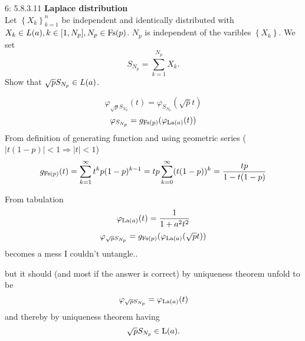 \documentclass[a4paper,twoside=false,abstract=false,numbers=noenddot,
titlepage=false,headings=small,parskip=half,version=last]{scrartcl}
\begin{document}

\begin{exercise}{6: 5.8.3.11} \textbf{Laplace distribution} \\
    Let $\left\{{X_k}\right\}_{k=1}^n$ be independent and identically
    distributed with
    ${X_k \in\text{$L$}(a),}\, {k\in[1,N_p],}\, {N_p\in \text{Fs}(p)}$.
    $N_p$ is independent of the varibles $\left\{X_k\right\}$. We set
    \begin{equation}
        S_{N_p} = \sum\limits_{k=1}^{N_p}X_k.
    \end{equation}
    Show that $\sqrt{p}S_{N_p}\in\text{$L$}(a)$.
\end{exercise}
\begin{solution}
    \begin{equation}
        \varphi_{\sqrt{p}S_{N_p}}(t) = \varphi_{S_{N_p}}(\sqrt{p}t)
    \end{equation}
    \begin{equation}
        \varphi_{S_{N_p}} = g_{\text{Fs}(p)}(\varphi_{\text{La}(a)}(t))
    \end{equation}
    From definition of generating function and using geometric series
    ($|t(1-p)|<1\Rightarrow |t|<1$)
    \begin{equation}
        g_{\text{Fs}(p)}(t) = \sum\limits_{k=1}^\infty t^kp(1-p)^{k-1} =
        tp\sum\limits_{k=0}^\infty (t(1-p))^k = \frac{tp}{1-t(1-p)}
    \end{equation}

    From tabulation
    \begin{equation}
        \varphi_{\text{La}(a)}(t) = \frac{1}{1+a^2t^2}
    \end{equation}
    \begin{equation}
        \varphi_{\sqrt{p}S_{N_p}} =
        g_{\text{Fs}(p)}(\varphi_{\text{La}(a)}(\sqrt{p}t))
    \end{equation}
    becomes a mess I couldn't untangle..

    but it should (and most if the answer is correct) by uniqueness theorem
    unfold to be
    \begin{equation}
        \varphi_{\sqrt{p}S_{N_p}} = \varphi_{\text{La}(a)}(t)
    \end{equation}
    and thereby by uniqueness theorem having
    \begin{equation}
        \sqrt{p}S_{N_p}\in\text{L}(a).
    \end{equation}

\end{solution}
\pagebreak
\end{document}
